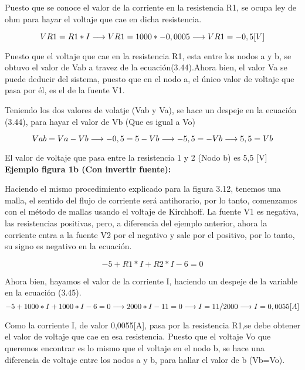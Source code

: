 \begin{example}
Puesto que se conoce el valor de la corriente en la resistencia R1, se ocupa ley de ohm para hayar el voltaje que cae en dicha resistencia.

\begin {equation*}
\notag
VR1= R1*I
\longrightarrow
VR1=1000*-0,0005
\longrightarrow
VR1= -0,5[V]
\end {equation*}

\newpage
Puesto que el voltaje que cae en la resistencia R1, esta entre los nodos a y b, se obtuvo el valor de Vab a travez de la ecuación(3.44).Ahora bien, el valor Va se puede deducir del sistema, puesto que en el nodo a, el único valor de voltaje que pasa por él, es el de la fuente V1.

Teniendo los dos valores de volatje (Vab y Va), se hace un despeje en la ecuación (3.44), para hayar el valor de Vb (Que es igual a Vo)

\begin {equation*}
\notag
Vab= Va-Vb
\longrightarrow
-0,5=5-Vb
\longrightarrow
-5,5=-Vb
\longrightarrow
5,5=Vb
\end {equation*}

El valor de voltaje que pasa entre la resistencia 1 y 2 (Nodo b) es 5,5 [V]
\\
\textbf{Ejemplo figura 1b (Con invertir fuente):}


Haciendo el mismo procedimiento explicado para la figura 3.12, tenemos una malla, el sentido del flujo de corriente será antihorario, por lo tanto, comenzamos con el método de mallas usando el voltaje de Kirchhoff. La fuente V1 es negativa, las resistencias positivas, pero, a diferencia del ejemplo anterior, ahora la corriente entra a la fuente V2 por el negativo y sale por el positivo, por lo tanto, su signo es negativo en la ecuación.
\begin{center}
\begin {equation*}
-5+R1*I + R2*I -6 =0 
\end {equation*}
\end{center}

Ahora bien, hayamos el valor de la corriente I, haciendo un despeje de la variable en la ecuación (3.45).
\begin {equation*}
\notag
-5 +1000*I +1000*I -6 =0
\longrightarrow
2000*I -11=0
\longrightarrow
I =11/2000
\longrightarrow
I=0,0055 [A]
\end {equation*}

Como la corriente I, de valor 0,0055[A], pasa por la resistencia R1,se debe obtener el valor de voltaje que cae en esa resistencia. Puesto que el voltaje Vo que queremos encontrar es lo mismo que el voltaje en el nodo b, se hace una diferencia de voltaje entre los nodos a y b, para hallar el valor de b (Vb=Vo).


\end{example}
